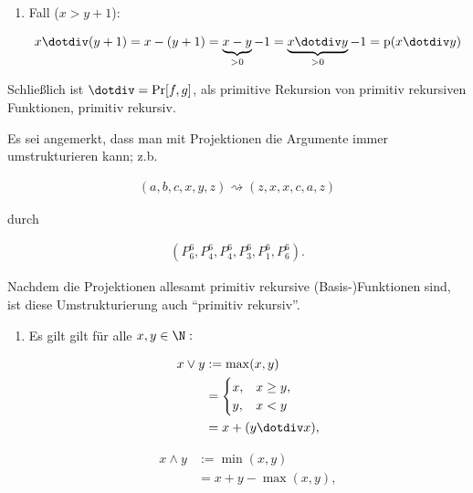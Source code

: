 \begin{solution}
\begin{enumerate}[label = (\alph*)]
\begin{enumerate}[label = \arabic*.]
        \item Fall ($x > y + 1$):
            
        \begin{align*}
            x \dotdiv (y + 1)
            =
            x - (y + 1)
            =
            \underbrace{x - y}_{> 0} - 1
            =
            \underbrace{x \dotdiv y}_{> 0} - 1
            =
            \operatorname p(x \dotdiv y)
        \end{align*}    

    \end{enumerate}

    Schließlich ist $\operatorname \dotdiv = \Pr[f, g]$, als primitive Rekursion von primitiv rekursiven Funktionen, primitiv rekursiv.

\end{enumerate}

Es sei angemerkt, dass man mit Projektionen die Argumente immer umstrukturieren kann;
z.b.

\begin{align*}
    (a, b, c, x, y, z) \rightsquigarrow (z, x, x, c, a, z)
\end{align*}

durch

\begin{align*}
    (P_6^6, P_4^6, P_4^6, P_3^6, P_1^6, P_6^6).
\end{align*}

Nachdem die Projektionen allesamt primitiv rekursive (Basis-)Funktionen sind, ist diese Umstrukturierung auch \enquote{primitiv rekursiv}.

\begin{enumerate}[label = (\alph*), start = 4]

    \item Es gilt gilt für alle $x, y \in \N:$
    

    \begin{align*}
        x \lor y
        & :=
        \max(x, y) \\
        & =
        \begin{cases}
            x, & x \geq y, \\
            y, & x < y
        \end{cases} \\
        & =
        x + (y \dotdiv x),
    \end{align*}

    \begin{align*}
        x \land y
        & :=
        \min(x, y) \\
        & =
        x + y - \max(x, y),
    \end{align*}


\end{enumerate}
\end{solution}
